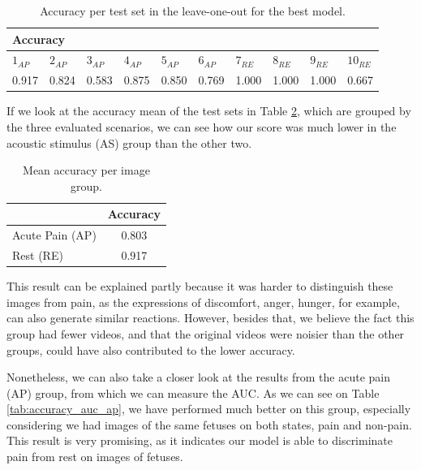\begin{table}[h!tp]
\centering
\caption{Accuracy per test set in the leave-one-out for the best model.}
\label{tab:accuracy_leave_one_out}
\begin{tabular}{llllllllll}
\hline
\multicolumn{10}{l}{Accuracy}        \\ \hline
\multicolumn{1}{l|}{$1_{AP}$}  & \multicolumn{1}{l|}{$2_{AP}$}  & \multicolumn{1}{l|}{$3_{AP}$}  & \multicolumn{1}{l|}{$4_{AP}$}  & \multicolumn{1}{l|}{$5_{AP}$}  & \multicolumn{1}{l|}{$6_{AP}$}  & \multicolumn{1}{l|}{$7_{RE}$}  & \multicolumn{1}{l|}{$8_{RE}$}  & \multicolumn{1}{l|}{$9_{RE}$}  & $10_{RE}$  \\ \hline
\multicolumn{1}{l|}{0.917} & \multicolumn{1}{l|}{0.824} & \multicolumn{1}{l|}{0.583} & \multicolumn{1}{l|}{0.875} & \multicolumn{1}{l|}{0.850} & \multicolumn{1}{l|}{0.769} & \multicolumn{1}{l|}{1.000} & \multicolumn{1}{l|}{1.000} & \multicolumn{1}{l|}{1.000} & 0.667  \\ \hline
\end{tabular}
\end{table}

If we look at the accuracy mean of the test sets in Table \ref{tab:mean_accuracy_group}, which are grouped by the three evaluated scenarios, we can see how our score was much lower in the acoustic stimulus (AS) group than the other two. 

\begin{table}[h!tp]
\centering
\caption{Mean accuracy per image group.}
\label{tab:mean_accuracy_group}
\begin{tabular}{lc}
\hline
                       & Accuracy \\ \hline
Acute Pain (AP)        & 0.803    \\
Rest (RE)              & 0.917    \\ \hline
\end{tabular}
\end{table}

This result can be explained partly because it was harder to distinguish these images from pain, as the expressions of discomfort, anger, hunger, for example, can also generate similar reactions. However, besides that, we believe the fact this group had fewer videos, and that the original videos were noisier than the other groups, could have also contributed to the lower accuracy.

Nonetheless, we can also take a closer look at the results from the acute pain (AP) group, from which we can measure the AUC. As we can see on Table \ref{tab:accuracy_auc_ap}, we have performed much better on this group, especially considering we had images of the same fetuses on both states, pain and non-pain. This result is very promising, as it indicates our model is able to discriminate pain from rest on images of fetuses.

